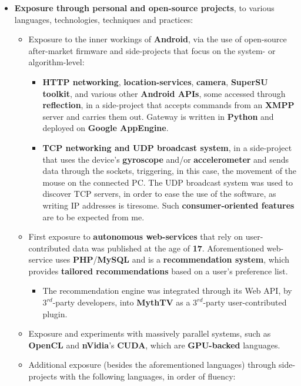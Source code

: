 \documentclass[12pt,a4paper]{article}
\begin{document}
\begin{itemize}
\begin{itemize}
		\end{itemize}
	\item	\textbf{Exposure through personal and open-source projects}, to various languages, technologies, techniques and practices:
		\begin{itemize}
		\item	Exposure to the inner workings of \textbf{Android}, via the use of open-source after-market firmware and side-projects that focus on the system- or algorithm-level:
			\begin{itemize}
			\item	\textbf{HTTP networking}, \textbf{location-services}, \textbf{camera}, \textbf{SuperSU toolkit}, and various other \textbf{Android APIs}, some accessed through \textbf{reflection}, in a side-project that accepts commands from an \textbf{XMPP} server and carries them out. Gateway is written in \textbf{Python} and deployed on \textbf{Google AppEngine}.
			\item	\textbf{TCP networking and UDP broadcast system}, in a side-project that uses the device's \textbf{gyroscope} and/or \textbf{accelerometer} and sends data through the sockets, triggering, in this case, the movement of the mouse on the connected PC. The UDP broadcast system was used to discover TCP servers, in order to ease the use of the software, as writing IP addresses is tiresome. Such \textbf{consumer-oriented features} are to be expected from me.
			\end{itemize}
		\item	First exposure to \textbf{autonomous web-services} that rely on user-contributed data was published at the age of \textbf{17}. Aforementioned web-service uses \textbf{PHP}/\textbf{MySQL} and is a \textbf{recommendation system}, which provides \textbf{tailored recommendations} based on a user's preference list.
			\begin{itemize}
			\item	The recommendation engine was integrated through its Web API, by $3^{rd}$-party developers, into \textbf{MythTV} as a $3^{rd}$-party user-contributed plugin.
			\end{itemize}
		\item	Exposure and experiments with massively parallel systems, such as \textbf{OpenCL} and \textbf{nVidia}'s \textbf{CUDA}, which are \textbf{GPU-backed} languages.
		\item	Additional exposure (besides the aforementioned languages) through side-projects with the following languages, in order of fluency:
			\begin{itemize}

\end{itemize}
\end{itemize}
\end{itemize}
\end{document}
